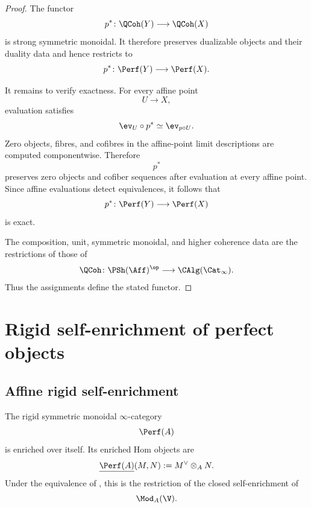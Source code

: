 \begin{proof}
The functor
\[
    p^*
    \colon
    \QCoh(Y)
    \longrightarrow
    \QCoh(X)
\]
is strong symmetric monoidal. It therefore preserves dualizable objects
and their duality data and hence restricts to
\[
    p^*
    \colon
    \Perf(Y)
    \longrightarrow
    \Perf(X).
\]

It remains to verify exactness. For every affine point
\[
    U
    \longrightarrow
    X,
\]
evaluation satisfies
\[
    \ev_U\circ p^*
    \simeq
    \ev_{p\circ U}.
\]
Zero objects, fibres, and cofibres in the affine-point limit descriptions
are computed componentwise. Therefore
\[
    p^*
\]
preserves zero objects and cofiber sequences after evaluation at every
affine point. Since affine evaluations detect equivalences, it follows
that
\[
    p^*
    \colon
    \Perf(Y)
    \longrightarrow
    \Perf(X)
\]
is exact.

The composition, unit, symmetric monoidal, and higher coherence data are
the restrictions of those of
\[
    \QCoh
    \colon
    \PSh(\Aff)^{\op}
    \longrightarrow
    \CAlg(\Cat_\infty).
\]
Thus the assignments define the stated functor.
\end{proof}

\section{Rigid self-enrichment of perfect objects}
\label{sec:perfect-self-enrichment}


\subsection{Affine rigid self-enrichment}

\begin{theorem}
\label{thm:perfect-self-enrichment}
The rigid symmetric monoidal $\infty$-category
\[
    \Perf(A)
\]
is enriched over itself. Its enriched Hom objects are
\[
    \underline{\Perf(A)}(M,N)
    :=
    M^\vee\otimes_A N.
\]
Under the equivalence of
,
this is the restriction of the closed self-enrichment of
\[
    \Mod_A(\V).
\]
\end{theorem}

